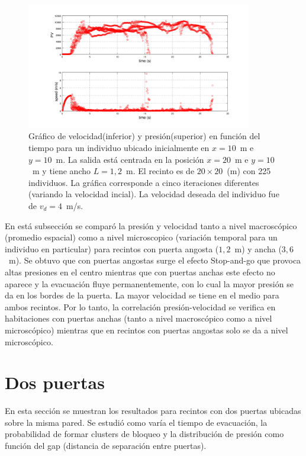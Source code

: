 \begin{figure}[H]
    \centering
    \includegraphics[height=5.5cm]{figuras/pv_vel_t_100_1_2.png}
    \caption[width=5cm]{Gráfico de velocidad(inferior) y presión(superior) en función del tiempo para un individuo ubicado inicialmente en $x=10$~m e $y=10$~m.  La salida está centrada en la posición $x=20$~m e $y=10$~m y tiene ancho $L=1,2$~m. El recinto es de $20\times 20$~(m) con 225 individuos. La gráfica corresponde a cinco iteraciones diferentes (variando la velocidad incial). La velocidad deseada del individuo fue de $v_d=4$~m/s.}
    \label{pv_vel_t_100_1_2}
\end{figure}


En está subsección se comparó la presión y velocidad tanto a nivel macroscópico (promedio espacial) como a nivel microscopico (variación temporal para un individuo en particular) para recintos con puerta angosta ($1,2$~m) y ancha ($3,6$~m). Se obtuvo que con puertas angostas surge el efecto Stop-and-go que provoca altas presiones en el centro mientras que con puertas anchas este efecto no aparece y la evacuación fluye permanentemente, con lo cual la mayor presión se da en los bordes de la puerta. La mayor velocidad se tiene en el medio para ambos recintos. Por lo tanto, la correlación presión-velocidad se verifica en habitaciones con puertas anchas (tanto a nivel macroscópico como a nivel microscópico) mientras que en recintos con puertas angostas solo se da a nivel microscópico.  


\section{Dos puertas}

En esta sección se muestran los resultados para recintos con dos puertas ubicadas sobre la misma pared. Se estudió como varía el tiempo de evacuación, la probabilidad de formar clusters de bloqueo y la distribución de presión como función del gap (distancia de separación entre puertas).  

